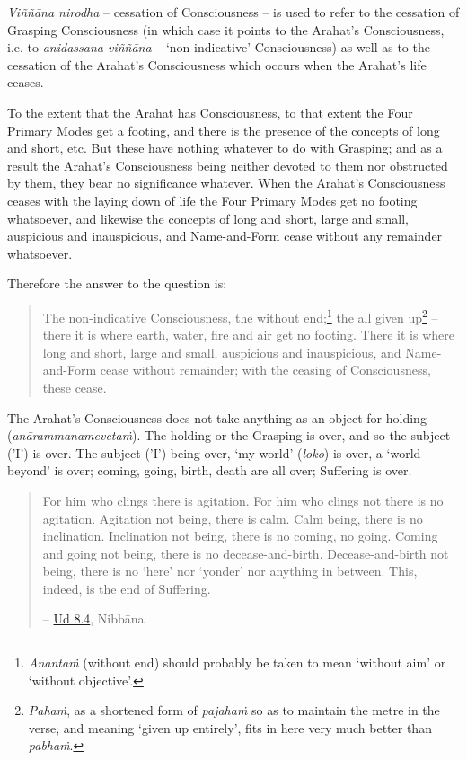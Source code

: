 \textit{Viññāna nirodha} -- cessation of Consciousness -- is used to refer to the cessation of Grasping Consciousness (in which case it points to the Arahat's Consciousness, i.e. to \textit{anidassana viññāna} -- `non-indicative' Consciousness) as well as to the cessation of the Arahat's Consciousness which occurs when the Arahat's life ceases.

To the extent that the Arahat has Consciousness, to that extent the Four Primary Modes get a footing, and there is the presence of the concepts of long and short, etc. But these have nothing whatever to do with Grasping; and as a result the Arahat's Consciousness being neither devoted to them nor obstructed by them, they bear no significance whatever. When the Arahat's Consciousness ceases with the laying down of life the Four Primary Modes get no footing whatsoever, and likewise the concepts of long and short, large and small, auspicious and inauspicious, and Name-and-Form cease without any remainder whatsoever.

Therefore the answer to the question is:

\begin{quote}
The non-indicative Consciousness, the without end;\footnote{\textit{Anantaṁ} (without end) should probably be taken to mean `without aim' or `without objective'.} the all given up\footnote{\textit{Pahaṁ}, as a shortened form of \textit{pajahaṁ} so as to maintain the metre in the verse, and meaning `given up entirely', fits in here very much better than \textit{pabhaṁ}.} -- there it is where earth, water, fire and air get no footing. There it is where long and short, large and small, auspicious and inauspicious, and Name-and-Form cease without remainder; with the ceasing of Consciousness, these cease.
\end{quote}

The Arahat's Consciousness does not take anything as an object for holding (\textit{anārammanamevetaṁ}). The holding or the Grasping is over, and so the subject ('I') is over. The subject ('I') being over, `my world' (\textit{loko}) is over, a `world beyond' is over; coming, going, birth, death are all over; Suffering is over.

\begin{quote}
For him who clings there is agitation. For him who clings not there is no agitation. Agitation not being, there is calm. Calm being, there is no inclination. Inclination not being, there is no coming, no going. Coming and going not being, there is no decease-and-birth. Decease-and-birth not being, there is no `here' nor `yonder' nor anything in between. This, indeed, is the end of Suffering.

 -- \href{https://suttacentral.net/ud8.4/en/anandajoti}{Ud 8.4}, Nibbāna
\end{quote}


